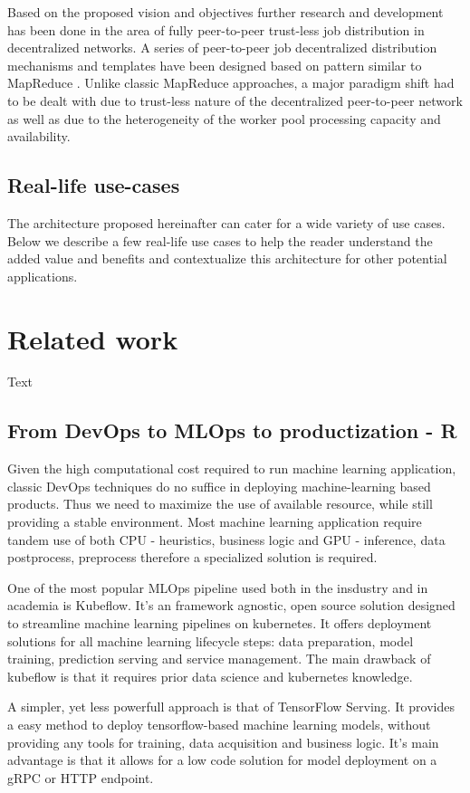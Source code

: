 \documentclass{article}
\begin{document}
Based on the proposed vision and objectives further research and development has been done in the area of fully peer-to-peer trust-less job distribution in decentralized networks. A series of peer-to-peer job decentralized distribution mechanisms and templates have been designed based on pattern similar to MapReduce \cite{dean2008mapreduce}. Unlike classic MapReduce approaches, a major paradigm shift had to be dealt with due to trust-less nature of the decentralized peer-to-peer network as well as due to the heterogeneity of the worker pool processing capacity and availability.

\subsection{Real-life use-cases}
The architecture proposed hereinafter can cater for a wide variety of use cases. Below we describe a few real-life use cases to help the reader understand the added value and benefits and contextualize this architecture for other potential applications.
\section{Related work}
Text
\subsection{From DevOps to MLOps to productization - R}
Given the high computational cost required to run machine learning application, classic DevOps techniques do no suffice in deploying machine-learning based products. Thus we need to maximize the use of available resource, while still providing a stable environment. Most machine learning application require tandem use of both CPU - heuristics, business logic and GPU - inference, data postprocess, preprocess therefore a specialized solution is required.

One of the most popular MLOps pipeline used both in the insdustry and in academia is Kubeflow. It's an framework agnostic, open source solution designed to streamline machine learning pipelines on kubernetes. It offers deployment solutions for all machine learning lifecycle steps: data preparation, model training, prediction serving and service management. The main drawback of kubeflow is that it requires prior data science and kubernetes knowledge.

A simpler, yet less powerfull approach is that of TensorFlow Serving. It provides a easy method to deploy tensorflow-based machine learning models, without providing any tools for training, data acquisition and business logic. It's main advantage is that it allows for a low code solution for model deployment on a gRPC or HTTP endpoint.
\end{document}
